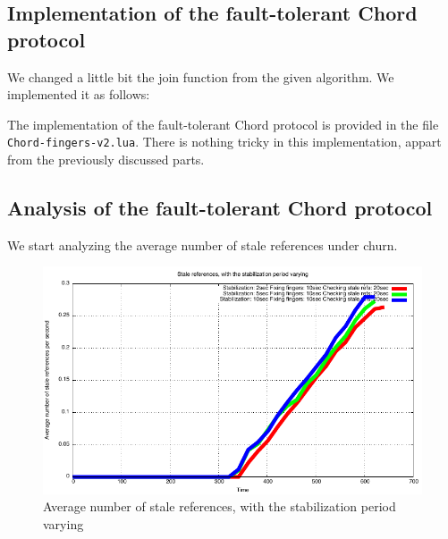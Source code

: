 \message{ !name(LSDS_project2_hayezl.tex)}\documentclass[a4paper, 11pt]{article}
\theoremstyle{plain}
\theoremstyle{definition}
\begin{document}
  \subsection{Implementation of the fault-tolerant Chord protocol}
  \label{sec:impl-ft-chord}
  
    We changed a little bit the join function from the given algorithm. We implemented it as follows:

    

    The implementation of the fault-tolerant Chord protocol is provided in the file
    \texttt{Chord-fingers-v2.lua}. There is nothing tricky in this implementation, appart from the previously
    discussed parts. 
    
    
  \subsection{Analysis of the fault-tolerant Chord protocol}
  \label{sec:eval-ft-chord}

    We start analyzing the average number of stale references under churn. 

    \begin{figure}[h]
      \centering
      \includegraphics{plots/Average-SR-stabilization.pdf}
      \caption{Average number of stale references, with the stabilization period varying}
      \label{fig:Av-SR-stab}
    \end{figure}
    
\end{document}
